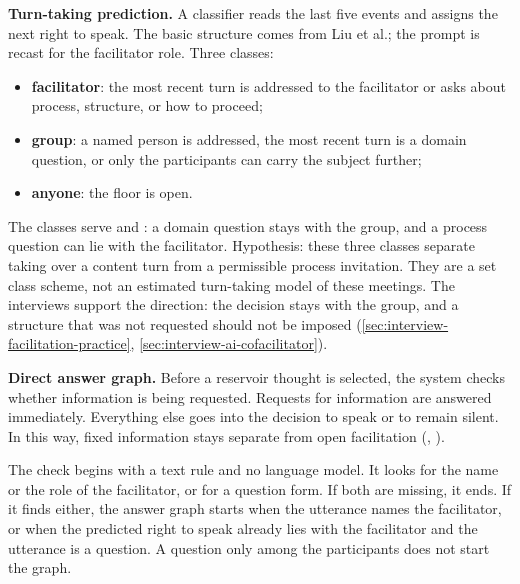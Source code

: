 \textbf{Turn-taking prediction.}
A classifier reads the last five events and assigns the next right to speak.
The basic structure comes from Liu et al.; the prompt is recast for the facilitator role.
Three classes:
\begin{itemize}
  \item \textbf{facilitator}: the most recent turn is addressed to the facilitator or asks about process,
    structure, or how to proceed;
  \item \textbf{group}: a named person is addressed, the most recent turn is a domain question, or only
    the participants can carry the subject further;
  \item \textbf{anyone}: the floor is open.
\end{itemize}
The classes serve  and : a domain question stays with the
group, and a process question can lie with the facilitator.
Hypothesis: these three classes separate taking over a content turn from a permissible
process invitation.
They are a set class scheme, not an estimated turn-taking model of these meetings.
The interviews support the direction: the decision stays with the group, and a structure that was not
requested should not be imposed
(\autoref{sec:interview-facilitation-practice}, \autoref{sec:interview-ai-cofacilitator}).

\textbf{Direct answer graph.}
Before a reservoir thought is selected, the system checks whether information is being requested.
Requests for information are answered immediately.
Everything else goes into the decision to speak or to remain silent.
In this way, fixed information stays separate from open facilitation
(, ).

The check begins with a text rule and no language model.
It looks for the name or the role of the facilitator, or for a question form.
If both are missing, it ends.
If it finds either, the answer graph starts when the utterance names the facilitator, or when
the predicted right to speak already lies with the facilitator and the utterance is a question.
A question only among the participants does not start the graph.

